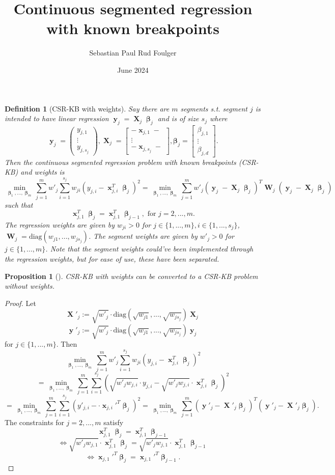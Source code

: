 \documentclass[12pt]{article}
\title{Continuous segmented regression with known breakpoints}
\author{Sebastian Paul Rud Foulger}
\date{June 2024}
\DeclareMathOperator{\bx}{\textbf{x}}
\DeclareMathOperator{\bX}{\textbf{X}}
\DeclareMathOperator{\by}{\textbf{y}}
\DeclareMathOperator{\bW}{\textbf{W}}
\DeclareMathOperator{\bbeta}{\boldsymbol{\beta}}
\newtheorem{defn}{Definition}
\newtheorem{prop}{Proposition}
\begin{document}
\begin{defn}[CSR-KB with weights]
Say there are $m$ segments s.t. segment $j$ is intended to have linear regression $\by_j = \bX_j \bbeta_j$ and is of size $s_j$ where
$$\by_j = \begin{pmatrix}
y_{j,1} \\
\vdots \\
y_{j,s_j}
\end{pmatrix}, \bX_j = 
\begin{bmatrix}
-\bx_{j,1}-  \\
\vdots \\
-\bx_{j,s_j}-
\end{bmatrix}, \boldsymbol{\beta}_j = 
\begin{bmatrix}
\beta_{j,1}  \\
\vdots \\
\beta_{j,d}
\end{bmatrix}.$$
Then the continuous segmented regression problem with known breakpoints (CSR-KB) and weights is
$$\min_{\bbeta_1,...,\bbeta_m} \sum_{j=1}^m w'_j\sum_{i=1}^{s_j} w_{ji}(y_{j, i}-\bx_{j, i}^T\bbeta_j)^2 = \min_{\bbeta_1,...,\bbeta_m} \sum_{j=1}^m w'_j (\by_j-\bX_j\bbeta_j)^T\bW_j(\by_j-\bX_j\bbeta_j)$$
such that
$$\bx_{j, 1}^T \bbeta_j = \bx_{j, 1}^T \bbeta_{j-1}, \text{ for }j=2, ..., m.$$
The regression weights are given by $w_{ji} > 0$ for $j\in \{1, ..., m\}, i \in \{1, ..., s_j\}$, $\bW_j = \text{diag}(w_{j1}, ..., w_{js_j})$. The segment weights are given by $w'_j > 0$ for $j \in \{1, ..., m\}$. Note that the segment weights could've been implemented through the regression weights, but for ease of use, these have been separated. 
\end{defn}
\begin{prop}[] \label{prop:convert}
CSR-KB with weights can be converted to a CSR-KB problem without weights.
\end{prop}
\begin{proof}
Let
$$\bX'_j := \sqrt{w'_j} \cdot \text{diag}\left(\sqrt{w_{j1}}, ..., \sqrt{w_{js_j}}\right)\bX_j$$
$$\by'_j := \sqrt{w'_j} \cdot \text{diag}\left(\sqrt{w_{j1}}, ..., \sqrt{w_{js_j}}\right)\by_j$$
for $j \in \{1, ..., m\}$. Then
$$\min_{\bbeta_1,...,\bbeta_m} \sum_{j=1}^m w'_j\sum_{i=1}^{s_j} w_{ji}(y_{j, i}-\bx_{j, i}^T\bbeta_j)^2 $$
$$=\min_{\bbeta_1,...,\bbeta_m} \sum_{j=1}^m \sum_{i=1}^{s_j} \left(\sqrt{w'_j w_{j,i}} \cdot y_{j, i}-\sqrt{w'_j w_{j,i}} \cdot \bx_{j, i}^T\bbeta_j \right)^2 $$
$$=\min_{\bbeta_1,...,\bbeta_m} \sum_{j=1}^m \sum_{i=1}^{s_j} \left(y'_{j, i}- \cdot \bx_{j, i}'^T\bbeta_j \right)^2=\min_{\bbeta_1,...,\bbeta_m} \sum_{j=1}^m (\by'_j-\bX'_j\bbeta_j)^T(\by'_j-\bX'_j\bbeta_j).$$
The constraints for $j=2, ..., m$ satisfy
$$\bx_{j, 1}^T \bbeta_j = \bx_{j, 1}^T \bbeta_{j-1}$$
$$\iff \sqrt{w'_j w_{j,1}} \cdot \bx_{j, 1}^T \bbeta_j = \sqrt{w'_j w_{j,1}} \cdot \bx_{j, 1}^T \bbeta_{j-1} $$
$$\iff \bx_{j, 1}'^T \bbeta_j = \bx_{j, 1}'^T \bbeta_{j-1}.$$
\end{proof}
\end{document}

